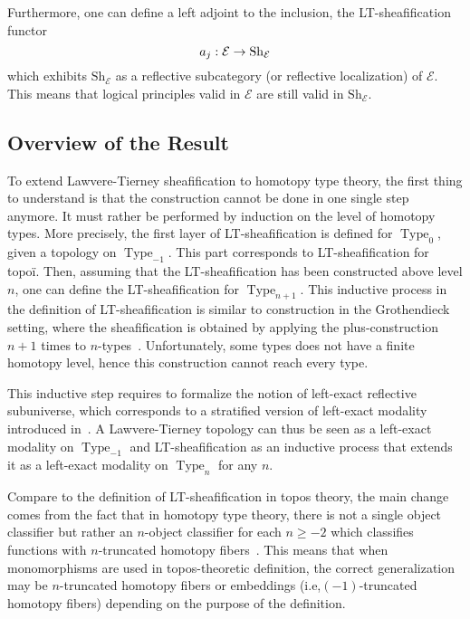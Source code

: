 \documentclass[preprint,9pt,numbers]{sigplanconf}
\newcommand{\ie}{i.e,\xspace}
\DeclareMathOperator{\Type}{Type}
\newcommand \E {\mathcal{E}}
\newcommand \Sh[1] {\mathrm{Sh}_{#1}}
\newenvironment{mymath}[1][-0em]{%
  \newcommand\mymathaux{\vspace{#1}}%
  \vspace{#1}%
  \begin{equation*}%
  }{ %
    \mymathaux%
  \end{equation*}}
\begin{document}
Furthermore, one can define a left adjoint to the inclusion, the
LT-sheafification functor
%
\begin{mymath}
a_j : \E \rightarrow \Sh{\E}
\end{mymath}%
which exhibits $\Sh{\E}$ as a reflective
subcategory (or reflective localization) of $\E$. This
means that logical principles valid in $\E$ are still valid in
$\Sh{\E}$.


\subsection{Overview of the Result}

To extend Lawvere-Tierney sheafification to homotopy type theory, the
first thing to understand is that the construction cannot be done in one
single step anymore. It must rather be performed by induction on the
level of homotopy types. More precisely, the first layer of
LT-sheafification is defined for $\Type_{0}$, given a topology on
$\Type_{-1}$. This part corresponds to LT-sheafification for topoï. Then,
assuming that the LT-sheafification has been constructed above level $n$,
one can define the LT-sheafification for $\Type_{n+1}$.
%
This inductive process in the definition of LT-sheafification is similar
to construction in the Grothendieck setting, where the
sheafification is obtained by applying the plus-construction $n\!+\!1$
times to
$n$-types~\cite[Chapter~6]{lurie}. Unfortunately, some types does not
have a finite homotopy level, hence this construction cannot reach
every type.

This inductive step requires to formalize the notion of left-exact
reflective subuniverse, which corresponds to a stratified version of
left-exact modality introduced in~\cite[Chapter~7]{hottbook}. A
Lawvere-Tierney topology can thus be seen as a left-exact modality on
$\Type_{-1}$ and LT-sheafification as an inductive process that extends
it as a left-exact modality on $\Type_{n}$ for any $n$.

Compare to the definition of LT-sheafification in topos theory, the main
change comes from the fact that in homotopy type theory, there is not
a single object classifier but rather an $n$-object classifier for
each $n\geq -2$ which classifies functions with $n$-truncated homotopy
fibers~\cite{sets_in_hott}. This means that when monomorphisms are used in topos-theoretic definition, the correct generalization may be $n$-truncated homotopy
fibers or embeddings (\ie $(-1)$-truncated homotopy
fibers) depending on the purpose of the definition.
\end{document}
